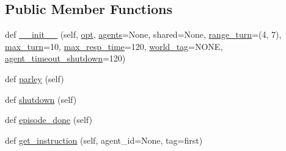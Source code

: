 \subsection*{Public Member Functions}
\begin{DoxyCompactItemize}
\item 
def \hyperlink{classparlai_1_1mturk_1_1tasks_1_1personachat_1_1personachat__chat_1_1worlds_1_1PersonaChatWorld_a2c2cc9c085e1c562ce88a845bc6811d1}{\+\_\+\+\_\+init\+\_\+\+\_\+} (self, \hyperlink{classparlai_1_1core_1_1worlds_1_1World_a3640d92718acd3e6942a28c1ab3678bd}{opt}, \hyperlink{classparlai_1_1mturk_1_1tasks_1_1personachat_1_1personachat__chat_1_1worlds_1_1PersonaChatWorld_a9b7cb2eee599053a23d83201036d57a1}{agents}=None, shared=None, \hyperlink{classparlai_1_1mturk_1_1tasks_1_1personachat_1_1personachat__chat_1_1worlds_1_1PersonaChatWorld_ad08f076173e395eea81ba3de824e166c}{range\+\_\+turn}=(4, 7), \hyperlink{classparlai_1_1mturk_1_1tasks_1_1personachat_1_1personachat__chat_1_1worlds_1_1PersonaChatWorld_a6f496f8f3c030b9e273f1d583a41f240}{max\+\_\+turn}=10, \hyperlink{classparlai_1_1mturk_1_1tasks_1_1personachat_1_1personachat__chat_1_1worlds_1_1PersonaChatWorld_aca25d3660a3dac91fa40ec7a18b214f5}{max\+\_\+resp\+\_\+time}=120, \hyperlink{classparlai_1_1mturk_1_1tasks_1_1personachat_1_1personachat__chat_1_1worlds_1_1PersonaChatWorld_a254ecf0c1c1d37f2f2027f4206abc321}{world\+\_\+tag}=\textquotesingle{}N\+O\+NE\textquotesingle{}, \hyperlink{classparlai_1_1mturk_1_1tasks_1_1personachat_1_1personachat__chat_1_1worlds_1_1PersonaChatWorld_ad93464fe08cb5ec2007ef03f6d65e0f4}{agent\+\_\+timeout\+\_\+shutdown}=120)
\item 
def \hyperlink{classparlai_1_1mturk_1_1tasks_1_1personachat_1_1personachat__chat_1_1worlds_1_1PersonaChatWorld_af1504dbfbf076f8e3dad5f8ac823f761}{parley} (self)
\item 
def \hyperlink{classparlai_1_1mturk_1_1tasks_1_1personachat_1_1personachat__chat_1_1worlds_1_1PersonaChatWorld_a86d1d4e599a470ec7f031c60b2fb0e61}{shutdown} (self)
\item 
def \hyperlink{classparlai_1_1mturk_1_1tasks_1_1personachat_1_1personachat__chat_1_1worlds_1_1PersonaChatWorld_a9497024a85da74e69e5b6a1568b5ff18}{episode\+\_\+done} (self)
\item 
def \hyperlink{classparlai_1_1mturk_1_1tasks_1_1personachat_1_1personachat__chat_1_1worlds_1_1PersonaChatWorld_accac4ee2dc51850f0af8fa43055023e7}{get\+\_\+instruction} (self, agent\+\_\+id=None, tag=\textquotesingle{}first\textquotesingle{})
\item 

\end{DoxyCompactItemize}
